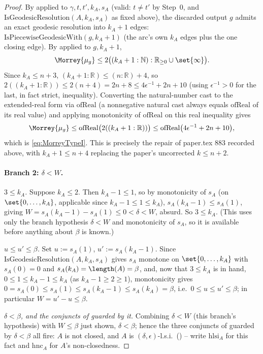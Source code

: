 \begin{proof}
  By  applied to $\gamma,t,t',k_A,s_A$ (valid: $t\ne t'$
  by Step~0, and $\mathrm{IsGeodesicResolution}(A,k_A,s_A)$ as fixed above), the discarded output
  $g$ admits an exact geodesic resolution into $k_A+1$ edges: $\mathrm{IsPiecewiseGeodesicWith}(g,
  k_A+1)$ (the arc's own $k_A$ edges plus the one closing edge). By  applied to
  $g,k_A+1$,
  \[
    \Morrey{\mu_g} \le 2\bigl((k_A+1:\mathbb{N}):\mathbb{R}_{\ge0}\cup\set{\infty}\bigr)
    .
  \]
  Since $k_A\le n+3$, $(k_A+1:\mathbb{R})\le(n:\mathbb{R})+4$, so $2((k_A+1:\mathbb{R}))\le
  2(n+4) = 2n+8 \le 4\epsilon^{-1}+2n+10$ (using $\epsilon^{-1}>0$ for the last, in fact strict,
  inequality). Converting the natural-number cast to the extended-real form via
  $\mathrm{ofReal}$ (a nonnegative natural cast always equals $\mathrm{ofReal}$ of its real value)
  and applying monotonicity of $\mathrm{ofReal}$ on this real inequality gives
  \[
    \Morrey{\mu_g} \le \mathrm{ofReal}\bigl(2((k_A+1:\mathbb{R}))\bigr) \le
    \mathrm{ofReal}\bigl(4\epsilon^{-1}+2n+10\bigr)
    ,
  \]
  which is \eqref{eq:MorreyTypeI}. This is precisely the repair of paper.tex 883 recorded above,
  with $k_A+1\le n+4$ replacing the paper's uncorrected $k\le n+2$.

  \paragraph{Branch 2: $\delta<W$.}

  \emph{$3\le k_A$.} Suppose $k_A\le2$. Then $k_A-1\le1$, so by monotonicity of $s_A$ (on
  $\set{0,\dots,k_A}$, applicable since $k_A-1\le1\le k_A$), $s_A(k_A-1)\le s_A(1)$, giving
  $W=s_A(k_A-1)-s_A(1)\le0<\delta<W$, absurd. So $3\le k_A$. (This uses only the branch hypothesis
  $\delta<W$ and monotonicity of $s_A$, so it is available before anything about $\beta$ is known.)

  \emph{$u\le u'\le\beta$.} Set $u:=s_A(1)$, $u':=s_A(k_A-1)$. Since
  $\mathrm{IsGeodesicResolution}(A,k_A,s_A)$ gives $s_A$ monotone on $\set{0,\dots,k_A}$ with
  $s_A(0)=0$ and $s_A(k_A)=\length(A)=\beta$, and, now that $3\le k_A$ is in hand,
  $0\le1\le k_A-1\le k_A$ (as $k_A-1\ge2\ge1$), monotonicity gives
  $0=s_A(0)\le s_A(1)\le s_A(k_A-1)\le s_A(k_A)=\beta$, i.e.\ $0\le u\le u'\le\beta$; in particular
  $W=u'-u\le\beta$.

  \emph{$\delta<\beta$, and the conjuncts of  guarded by it.}
  Combining $\delta<W$ (this branch's hypothesis) with $W\le\beta$ just shown, $\delta<\beta$;
  hence the three conjuncts of  guarded by $\delta<\beta$ all fire:
  $A$ is not closed, and $A$ is $(\delta,\epsilon)$-l.s.i.\ () -- write $\mathrm{hlsi}
  _A$ for this fact and $\mathrm{hnc}_A$ for $A$'s non-closedness.


\end{proof}
